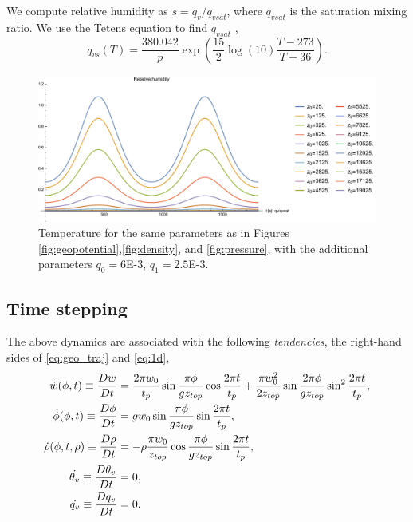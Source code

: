We compute relative humidity as $s = q_v/q_{vsat}$, where $q_{vsat}$ is the saturation mixing ratio.
We use the Tetens equation to find $q_{vsat}$ \cite[eqn. (A1)]{SoongOgura1973},
\begin{equation}\label{eq:tetens}
  q_{vs}(T) = \frac{380.042}{p}\exp\left(\frac{15}{2}\log(10) \frac{T-273}{T-36}\right).
\end{equation}

\begin{figure}[H]
\centering
\includegraphics[width=\linewidth]{figures/relhumidity_plot}
\caption{Temperature for the same parameters as in Figures \ref{fig:geopotential},\ref{fig:density}, and \ref{fig:pressure}, with the additional parameters $q_{0}=6$E-3, $q_1=2.5$E-3.}\label{fig:humidity}
\end{figure}


\subsection{Time stepping}

The above dynamics are associated with the following \emph{tendencies}, the right-hand sides of \eqref{eq:geo_traj} and \eqref{eq:1d},
\begin{subequations}\label{eq:tends}
  \begin{align}
     \dot{w}(\phi,t) \equiv \frac{D w}{Dt}  &= \frac{2\pi w_0}{t_p}\sin\frac{\pi\phi}{gz_{top}}\cos\frac{2\pi t}{t_p} + \frac{\pi w_0^2}{2z_{top}}\sin\frac{2\pi\phi}{gz_{top}}\sin^2\frac{2\pi t}{t_p},\\
    \dot{\phi}(\phi,t) \equiv \frac{D \phi}{Dt} &= gw_0 \sin \frac{\pi \phi}{g z_{top}}\sin\frac{2\pi t}{t_p},\\
    \dot{\rho}(\phi, t, \rho) \equiv \frac{D \rho}{Dt} &= -\rho \frac{\pi w_0}{z_{top}}\cos\frac{\pi \phi}{g z_{top}}\sin\frac{2\pi t}{t_p},\\
    \dot{\theta_v} \equiv \frac{D \theta_v}{Dt} &= 0,\\
    \dot{q_v} \equiv \frac{D q_v}{Dt} &= 0.
  \end{align}
\end{subequations} 

